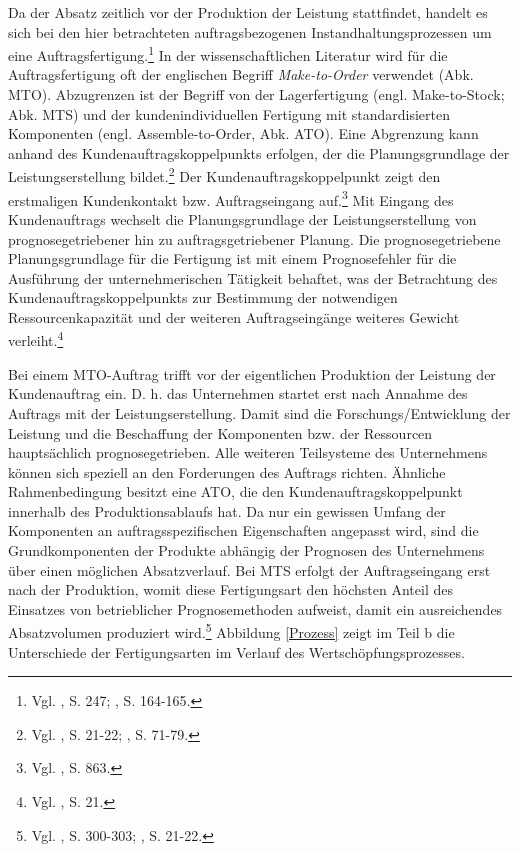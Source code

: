 Da der Absatz zeitlich vor der Produktion der Leistung stattfindet, handelt es sich bei den hier betrachteten auftragsbezogenen Instandhaltungsprozessen um eine Auftragsfertigung.\footnote{Vgl. \cite{hax1956industriebetrieb}, S. 247; \cite{Gutenberg1965dispos}, S. 164-165.} In der wissenschaftlichen Literatur wird für die Auftragsfertigung oft der englischen Begriff \textit{Make-to-Order} verwendet (Abk. MTO). Abzugrenzen ist der Begriff von der Lagerfertigung (engl. Make-to-Stock; Abk. MTS) und der kundenindividuellen Fertigung mit standardisierten Komponenten (engl. Assemble-to-Order, Abk. ATO). 
Eine Abgrenzung kann anhand des Kundenauftragskoppelpunkts erfolgen, der die Planungsgrundlage der Leistungserstellung bildet.\footnote{Vgl. \cite{quante2009management}, S. 21-22; \cite{sharman1984rediscovery}, S. 71-79.} Der Kundenauftragskoppelpunkt zeigt den erstmaligen Kundenkontakt bzw. Auftragseingang auf.\footnote{Vgl. \cite{Olhager2010863}, S. 863.} Mit Eingang des Kundenauftrags wechselt die Planungsgrundlage der Leistungserstellung von prognosegetriebener hin zu auftragsgetriebener Planung. Die prognosegetriebene Planungsgrundlage für die Fertigung ist mit einem Prognosefehler für die Ausführung der unternehmerischen Tätigkeit behaftet, was der Betrachtung des Kundenauftragskoppelpunkts zur Bestimmung der notwendigen Ressourcenkapazität und der weiteren Auftragseingänge weiteres Gewicht verleiht.\footnote{Vgl. \cite{quante2009management}, S. 21.} 

Bei einem MTO-Auftrag trifft vor der eigentlichen Produktion der Leistung der Kundenauftrag ein. D. h. das Unternehmen startet erst nach Annahme des Auftrags mit der Leistungserstellung. Damit sind die Forschungs/Entwicklung der Leistung und die Beschaffung der Komponenten bzw. der Ressourcen hauptsächlich prognosegetrieben. Alle weiteren Teilsysteme des Unternehmens können sich speziell an den Forderungen des Auftrags richten. Ähnliche Rahmenbedingung besitzt eine ATO, die den Kundenauftragskoppelpunkt innerhalb des Produktionsablaufs hat. Da nur ein gewissen Umfang der Komponenten an auftragsspezifischen Eigenschaften angepasst wird, sind die Grundkomponenten der Produkte abhängig der Prognosen des Unternehmens über einen möglichen Absatzverlauf. Bei MTS erfolgt der Auftragseingang erst nach der Produktion, womit diese Fertigungsart den höchsten Anteil des Einsatzes von betrieblicher Prognosemethoden aufweist, damit ein ausreichendes Absatzvolumen produziert wird.\footnote{Vgl. \cite{fleischmeyr2004codp}, S. 300-303; \cite{quante2009management}, S. 21-22.} Abbildung \ref{Prozess} zeigt im Teil b die Unterschiede der Fertigungsarten im Verlauf des Wertschöpfungsprozesses. 

